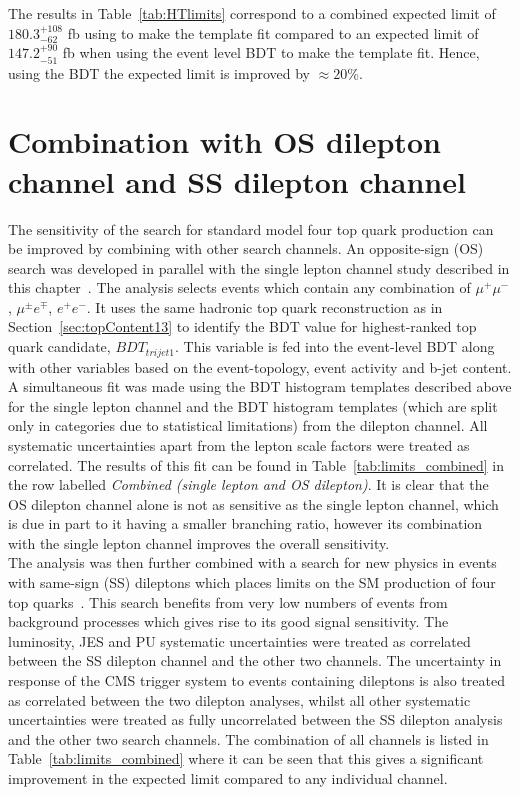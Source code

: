 The results in Table~\ref{tab:HTlimits} correspond to a combined expected limit of $180.3^{+108}_{-62}$ fb using \HT to make the template fit compared to an expected limit of $147.2^{+90}_{-51}$ fb when using the event level BDT to make the template fit. Hence, using the BDT the expected limit is improved by $\approx20\%$.



\section{Combination with OS dilepton channel and SS dilepton channel ~\label{sec:combo13}}

The sensitivity of the search for standard model four top quark production can be improved by combining with other search channels. An opposite-sign (OS) search was developed in parallel with the single lepton channel study described in this chapter~\cite{CMS-PAS-TOP-16-016}. The analysis selects events which contain any combination of $\mu^{+}\mu^{-}$, $\mu^{\pm} e^{\mp}$, $e^{+}e^{-}$. It uses the same hadronic top quark reconstruction as in Section~\ref{sec:topContent13} to identify the BDT value for highest-ranked top quark candidate, $BDT_{trijet1}$. This variable is fed into the event-level BDT along with other variables based on the event-topology, event activity and b-jet content. A simultaneous fit was made using the BDT histogram templates described above for the single lepton channel and the BDT histogram templates (which are split only in \njets categories due to statistical limitations) from the dilepton channel. All systematic uncertainties apart from the lepton scale factors were treated as correlated. The results of this fit can be found in Table~\ref{tab:limits_combined} in the row labelled \emph{Combined (single lepton and OS dilepton)}. It is clear that the OS dilepton channel alone is not as sensitive as the single lepton channel, which is due in part to it having a smaller branching ratio, however its combination with the single lepton channel improves the overall sensitivity.\\

The analysis was then further combined with a search for new physics in events with same-sign (SS) dileptons which places limits on the SM production of four top quarks~\cite{Khachatryan:2016kod}. This search benefits from very low numbers of events from background processes which gives rise to its good signal sensitivity. The luminosity, JES and PU systematic uncertainties were treated as correlated between the SS dilepton channel and the other two channels. The uncertainty in response of the CMS trigger system to events containing dileptons is also treated as correlated between the two dilepton analyses, whilst all other systematic uncertainties were treated as fully uncorrelated between the SS dilepton analysis and the other two search channels. The combination of all channels is listed in Table~\ref{tab:limits_combined} where it can be seen that this gives a significant improvement in the expected limit compared to any individual channel.


